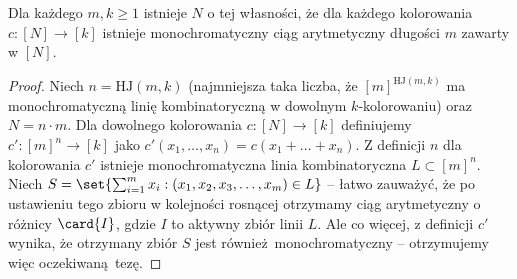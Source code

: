\begin{theorem}
	Dla każdego $m,k \ge 1$ istnieje $N$ o tej własności, że dla każdego kolorowania $c : [N] \to [k]$ istnieje monochromatyczny ciąg arytmetyczny długości $m$ zawarty w $[N]$.
\end{theorem}
\begin{proof}
	Niech $n = \text{HJ}(m,k)$ (najmniejsza taka liczba, że $[m]^{\text{HJ}(m,k)}$ ma monochromatyczną linię kombinatoryczną w dowolnym $k$-kolorowaniu) oraz $N = n\cdot m$.
	Dla dowolnego kolorowania $c:[N]\to [k]$ definiujemy $c': [m]^n \to [k]$ jako $c'(x_1,\ldots,x_n) = c(x_1+\ldots+x_n)$. Z definicji $n$ dla kolorowania $c'$ istnieje monochromatyczna
	linia kombinatoryczna $L \subset [m]^n$. Niech $S = \set{\sum_{i=1}^{m} x_i : (x_1, x_2, x_3, \ldots, x_m) \in L}$ -- łatwo zauważyć, że po ustawieniu tego
	zbioru w kolejności rosnącej otrzymamy ciąg arytmetyczny o różnicy $\card{I}$, gdzie $I$ to aktywny zbiór linii $L$. Ale co więcej, z definicji $c'$ wynika, że
	otrzymany zbiór $S$ jest również monochromatyczny -- otrzymujemy więc oczekiwaną tezę.
\end{proof}

